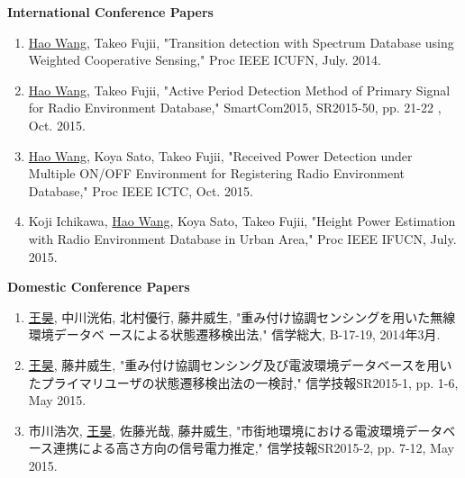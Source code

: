 \begin{publication}
{\bf International Conference Papers}
  \begin{enumerate}[{}i{.}]
  
      \item \underline{Hao Wang}, Takeo Fujii, "Transition detection with Spectrum Database using Weighted Cooperative Sensing," Proc IEEE ICUFN, July. 2014.
 
      \item \underline{Hao Wang}, Takeo Fujii, "Active Period Detection Method of Primary Signal for Radio Environment Database," SmartCom2015, SR2015-50, pp. 21-22 , Oct. 2015.
      \item \underline{Hao Wang}, Koya Sato, Takeo Fujii, "Received Power Detection under Multiple ON/OFF Environment for Registering Radio Environment Database," Proc IEEE ICTC, Oct. 2015.
 
      \item Koji Ichikawa, \underline{Hao Wang}, Koya Sato, Takeo Fujii, "Height Power Estimation with Radio Environment Database in Urban Area," Proc IEEE IFUCN, July. 2015.
   \end{enumerate}
{\bf Domestic Conference Papers}
    \begin{enumerate}[{}i{.}]
        \item \underline{王昊}, 中川洸佑, 北村優行, 藤井威生, "重み付け協調センシングを用いた無線環境データベ ースによる状態遷移検出法," 信学総大, B-17-19, 2014年3月.
         \item \underline{王昊}, 藤井威生, "重み付け協調センシング及び電波環境データベースを用いたプライマリユーザの状態遷移検出法の一検討," 信学技報SR2015-1, pp. 1-6, May 2015.
         \item 市川浩次, \underline{王昊}, 佐藤光哉, 藤井威生, "市街地環境における電波環境データベース連携による高さ方向の信号電力推定," 信学技報SR2015-2, pp. 7-12, May 2015.
    \end{enumerate}

\end{publication}
